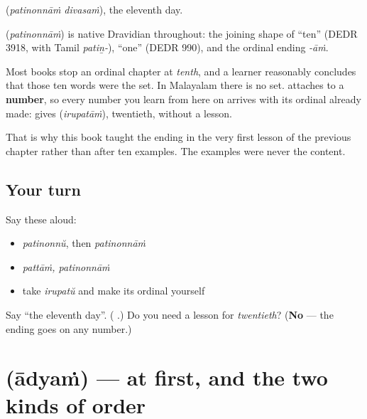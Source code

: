 \textbf{ } (\emph{patinonnāṁ divasaṁ}), the eleventh day.

\begin{cousinweb}
\textbf{} (\emph{patinonnāṁ}) is native Dravidian throughout: the joining shape of \textquotedblleft{}ten\textquotedblright{} (DEDR 3918, with Tamil \emph{patiṉ-}), \textquotedblleft{}one\textquotedblright{} (DEDR 990), and the ordinal ending \emph{-āṁ}.
\end{cousinweb}

\begin{grammarlens}[title={Grammar Lens: the ending is a fact about numbers, not about ten}]
Most books stop an ordinal chapter at \emph{tenth}, and a learner reasonably concludes that those ten words were the set. In Malayalam there is no set. \textbf{} attaches to a \textbf{number}, so every number you learn from here on arrives with its ordinal already made: \textbf{} gives \textbf{} (\emph{irupatāṁ}), twentieth, without a lesson.

That is why this book taught the ending in the very first lesson of the previous chapter rather than after ten examples. The examples were never the content.
\end{grammarlens}

\subsection*{Your turn}
Say these aloud:

\begin{itemize}
\raggedright
  \item \emph{patinonnŭ}, then \emph{patinonnāṁ}
  \item \emph{pattāṁ, patinonnāṁ}
  \item take \emph{irupatŭ} and make its ordinal yourself
\end{itemize}

\begin{tcolorbox}[breakable,colback=teal!4,colframe=teal!35!black,title={Before you move on}]
Say \textquotedblleft{}the eleventh day\textquotedblright{}. (\textbf{ }.) Do you need a lesson for \emph{twentieth}? (\textbf{No} — the ending goes on any number.)
\end{tcolorbox}
\section[Practice]{ (ādyaṁ) — at first, and the two kinds of order}

